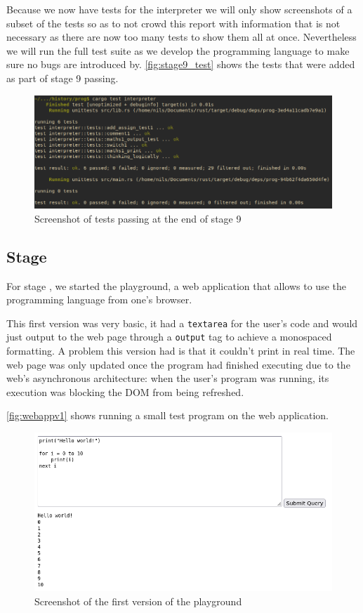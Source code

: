 \documentclass{article}
\newcommand{\subsecnum}{\the\value{subsection}}
\begin{document}
Because we now have tests for the interpreter we will only show screenshots of
a subset of the tests so as to not crowd this report with information that is
not necessary as there are now too many tests to show them all at once.
Nevertheless we will run the full test suite as we develop the programming
language to make sure no bugs are introduced by.
\autoref{fig:stage9_test} shows the tests that were added as part of stage 9
passing.

\begin{figure}
	\includegraphics[width=\textwidth]{stage9_test}
	\caption{Screenshot of tests passing at the end of stage 9}
	\label{fig:stage9_test}
\end{figure}

\subsection{Stage \subsecnum}

For stage \subsecnum, we started the playground, a web application that allows
to use the programming language from one's browser.

This first version was very basic, it had a \texttt{textarea} for the user's
code and would just output to the web page through a \texttt{output} tag to
achieve a monospaced formatting. A problem this version had is that it couldn't
print in real time. The web page was only updated once the program had finished
executing due to the web's asynchronous architecture: when the user's program
was running, its execution was blocking the DOM from being refreshed.

\autoref{fig:webappv1} shows running a small test program on the web
application.

\begin{figure}
	\includegraphics[width=\textwidth]{webappv1}
	\caption{Screenshot of the first version of the playground}
	\label{fig:webappv1}
\end{figure}
\end{document}
